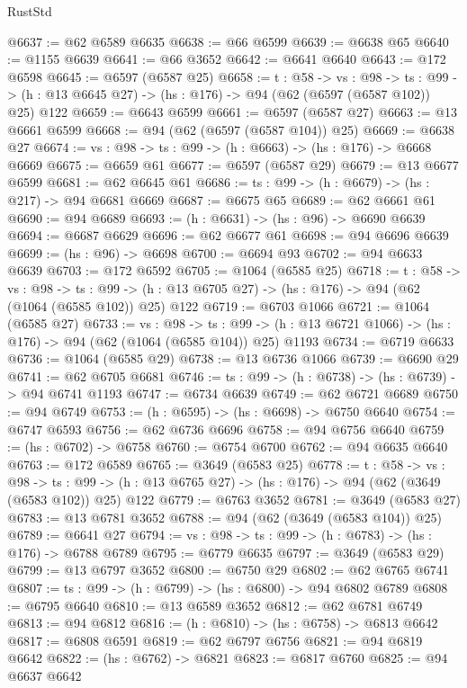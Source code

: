 \begin{lexlean}{RustStd}
\begin{coremodule}
{\begin{coremodule}
{{{{{{{{{@6637 := @62 @6589 @6635
@6638 := @66 @6599
@6639 := @6638 @65
@6640 := @1155 @6639
@6641 := @66 @3652
@6642 := @6641 @6640
@6643 := @172 @6598
@6645 := @6597 (@6587 @25)
@6658 := {t : @58} ->
  {vs : @98} ->
  {ts : @99} -> (h : @13 @6645 @27) -> (hs : @176) -> @94 (@62 (@6597 (@6587 @102)) @25) @122
@6659 := @6643 @6599
@6661 := @6597 (@6587 @27)
@6663 := @13 @6661 @6599
@6668 := @94 (@62 (@6597 (@6587 @104)) @25)
@6669 := @6638 @27
@6674 := {vs : @98} -> {ts : @99} -> (h : @6663) -> (hs : @176) -> @6668 @6669
@6675 := @6659 @61
@6677 := @6597 (@6587 @29)
@6679 := @13 @6677 @6599
@6681 := @62 @6645 @61
@6686 := {ts : @99} -> (h : @6679) -> (hs : @217) -> @94 @6681 @6669
@6687 := @6675 @65
@6689 := @62 @6661 @61
@6690 := @94 @6689
@6693 := (h : @6631) -> (hs : @96) -> @6690 @6639
@6694 := @6687 @6629
@6696 := @62 @6677 @61
@6698 := @94 @6696 @6639
@6699 := (hs : @96) -> @6698
@6700 := @6694 @93
@6702 := @94 @6633 @6639
@6703 := @172 @6592
@6705 := @1064 (@6585 @25)
@6718 := {t : @58} ->
  {vs : @98} ->
  {ts : @99} -> (h : @13 @6705 @27) -> (hs : @176) -> @94 (@62 (@1064 (@6585 @102)) @25) @122
@6719 := @6703 @1066
@6721 := @1064 (@6585 @27)
@6733 := {vs : @98} ->
  {ts : @99} -> (h : @13 @6721 @1066) -> (hs : @176) -> @94 (@62 (@1064 (@6585 @104)) @25) @1193
@6734 := @6719 @6633
@6736 := @1064 (@6585 @29)
@6738 := @13 @6736 @1066
@6739 := @6690 @29
@6741 := @62 @6705 @6681
@6746 := {ts : @99} -> (h : @6738) -> (hs : @6739) -> @94 @6741 @1193
@6747 := @6734 @6639
@6749 := @62 @6721 @6689
@6750 := @94 @6749
@6753 := (h : @6595) -> (hs : @6698) -> @6750 @6640
@6754 := @6747 @6593
@6756 := @62 @6736 @6696
@6758 := @94 @6756 @6640
@6759 := (hs : @6702) -> @6758
@6760 := @6754 @6700
@6762 := @94 @6635 @6640
@6763 := @172 @6589
@6765 := @3649 (@6583 @25)
@6778 := {t : @58} ->
  {vs : @98} ->
  {ts : @99} -> (h : @13 @6765 @27) -> (hs : @176) -> @94 (@62 (@3649 (@6583 @102)) @25) @122
@6779 := @6763 @3652
@6781 := @3649 (@6583 @27)
@6783 := @13 @6781 @3652
@6788 := @94 (@62 (@3649 (@6583 @104)) @25)
@6789 := @6641 @27
@6794 := {vs : @98} -> {ts : @99} -> (h : @6783) -> (hs : @176) -> @6788 @6789
@6795 := @6779 @6635
@6797 := @3649 (@6583 @29)
@6799 := @13 @6797 @3652
@6800 := @6750 @29
@6802 := @62 @6765 @6741
@6807 := {ts : @99} -> (h : @6799) -> (hs : @6800) -> @94 @6802 @6789
@6808 := @6795 @6640
@6810 := @13 @6589 @3652
@6812 := @62 @6781 @6749
@6813 := @94 @6812
@6816 := (h : @6810) -> (hs : @6758) -> @6813 @6642
@6817 := @6808 @6591
@6819 := @62 @6797 @6756
@6821 := @94 @6819 @6642
@6822 := (hs : @6762) -> @6821
@6823 := @6817 @6760
@6825 := @94 @6637 @6642
}}}}}}}}}
\end{coremodule}}
\end{coremodule}
\end{lexlean}
